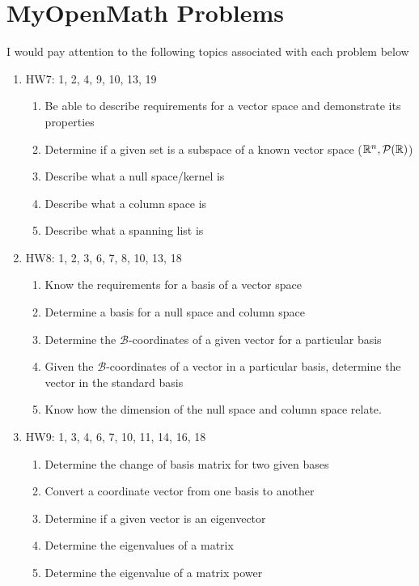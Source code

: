 \documentclass[12pt]{exam}
\begin{document}
\section{MyOpenMath Problems}
I would pay attention to the following topics associated with each problem below
\begin{enumerate}
    \item HW7: 1, 2, 4, 9, 10, 13, 19
        \begin{enumerate}
            \item Be able to describe requirements for a vector space and demonstrate its properties
            \item Determine if a given set is a subspace of a known vector space ($\mathbb{R}^n,\mathcal{P}(\mathbb{R})$)
            \item Describe what a null space/kernel is
            \item Describe what a column space is
            \item Describe what a spanning list is
        \end{enumerate}
    \item HW8: 1, 2, 3, 6, 7, 8, 10, 13, 18
        \begin{enumerate}
            \item Know the requirements for a basis of a vector space
            \item Determine a basis for a null space and column space
            \item Determine the $\mathcal{B}$-coordinates of a given vector for a particular basis
            \item Given the $\mathcal{B}$-coordinates of a vector in a particular basis, determine the vector in the standard basis
            \item Know how the dimension of the null space and column space relate.
        \end{enumerate}
    \item HW9: 1, 3, 4, 6, 7, 10, 11, 14, 16, 18
        \begin{enumerate}
            \item Determine the change of basis matrix for two given bases
            \item Convert a coordinate vector from one basis to another
            \item Determine if a given vector is an eigenvector
            \item Determine the eigenvalues of a matrix
            \item Determine the eigenvalue of a matrix power

\end{enumerate}
\end{enumerate}
\end{document}
